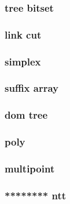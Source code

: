 \documentclass[a4paper,twocolumn]{article}
\begin{document}
% 


% 

\subsubsection{tree bitset}


\subsubsection{link cut}


\subsubsection{simplex}


\subsubsection{suffix array}



\subsubsection{dom tree}


\subsubsection{poly}


\subsubsection{multipoint}



\subsubsection{******** ntt}

\end{document}
